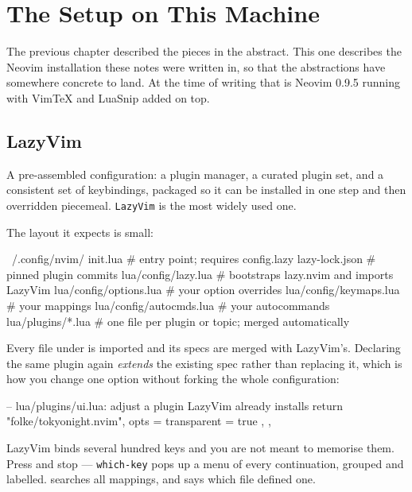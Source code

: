 \chapter{The Setup on This Machine}\label{ch:setup}

The previous chapter described the pieces in the abstract. This one describes
the Neovim installation these notes were written in, so that the abstractions
have somewhere concrete to land. At the time of writing that is Neovim 0.9.5
running  with VimTeX and LuaSnip added on top.

\section{LazyVim}

\begin{definition}[Distribution]
	A pre-assembled configuration: a plugin manager, a curated plugin set, and a
	consistent set of keybindings, packaged so it can be installed in one step and
	then overridden piecemeal. \texttt{LazyVim} \cite{lazyvim} is the most widely used one.
\end{definition}

The layout it expects is small:

\begin{vimcode}
~/.config/nvim/
  init.lua                 # entry point; requires config.lazy
  lazy-lock.json           # pinned plugin commits
  lua/config/lazy.lua      # bootstraps lazy.nvim and imports LazyVim
  lua/config/options.lua   # your option overrides
  lua/config/keymaps.lua   # your mappings
  lua/config/autocmds.lua  # your autocommands
  lua/plugins/*.lua        # one file per plugin or topic; merged automatically
\end{vimcode}

Every file under  is imported and its specs are merged with
LazyVim's. Declaring the same plugin again \emph{extends} the existing spec
rather than replacing it, which is how you change one option without forking
the whole configuration:

\begin{luacode}
-- lua/plugins/ui.lua: adjust a plugin LazyVim already installs
return {
  {
    "folke/tokyonight.nvim",
    opts = { transparent = true },
  },
}
\end{luacode}

\begin{note}
	LazyVim binds several hundred keys and you are not meant to memorise them.
	Press  and stop --- \texttt{which-key} pops up a menu of every
	continuation, grouped and labelled.    searches
	all mappings, and  says which file defined one.
\end{note}

